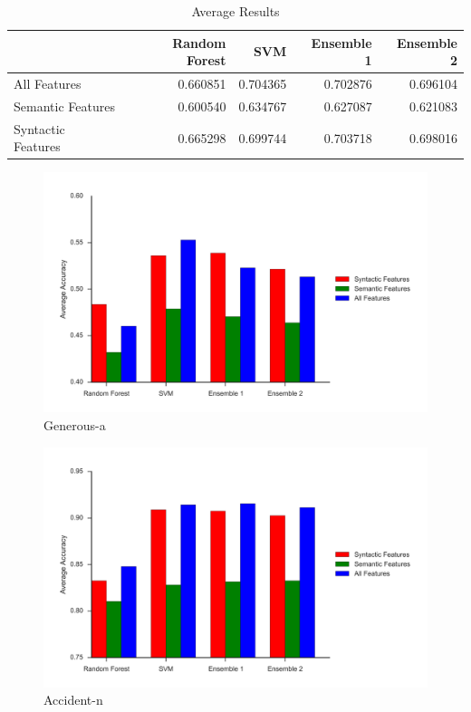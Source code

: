 \documentclass[12pt]{article}
\begin{document}
\FloatBarrier
\begin{table}[h!]
\begin{tabular}{lrrrr}
\toprule
{} &  Random Forest &       SVM &  Ensemble 1 &  Ensemble 2 \\
\midrule
All Features       &       0.660851 &  0.704365 &    0.702876 &    0.696104 \\
Semantic Features  &       0.600540 &  0.634767 &    0.627087 &    0.621083 \\
Syntactic Features &       0.665298 &  0.699744 &    0.703718 &    0.698016 \\
\bottomrule
\end{tabular}
\caption{Average Results}
\end{table}
\FloatBarrier

\begin{figure}[h!]
\caption{Generous-a}
\centering
\includegraphics[width=1.0\textwidth]{../graphics/plots/generous-a.png}
\end{figure}
\FloatBarrier

\begin{figure}[h!]
\caption{Accident-n}
\centering
\includegraphics[width=1.0\textwidth]{../graphics/plots/accident-n.png}
\end{figure}
\FloatBarrier
\end{document}
